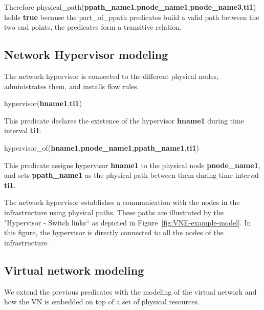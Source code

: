 Therefore physical\_path(\textbf{ppath\_name1},\textbf{pnode\_name1},\textbf{pnode\_name3},\textbf{ti1}) holds \textbf{true} because the part\_of\_ppath predicates build a valid path between the two end points, \eg the predicates form a transitive relation. 









\subsection{Network Hypervisor modeling}
The network hypervisor is connected to the different physical nodes, administrates them, and  installs flow rules.

\begin{myformula}
hypervisor(\textbf{hname1},\textbf{ti1})
\end{myformula}

This predicate declares the existence of the hypervisor \textbf{hname1} during time interval \textbf{ti1}.

\begin{myformula}
hypervisor\_of(\textbf{hname1},\textbf{pnode\_name1},\textbf{ppath\_name1},\textbf{ti1})
\end{myformula}

This predicate assigns hypervisor \textbf{hname1} to the physical node \textbf{pnode\_name1}, and sets \textbf{ppath\_name1} as the physical path between them during time interval \textbf{ti1}.

The network hypervisor establishes a communication with the nodes in the infrastructure using physical paths.
These paths are illustrated by the "Hypervisor - Switch links`` as depicted in Figure~\ref{fig:VNE-example-model}.
In this figure, the hypervisor is directly connected to all the nodes of the infrastructure.



\subsection{Virtual network modeling}
We extend the previous predicates with the modeling of the virtual network and how the VN is embedded on top of a set of physical resources.

